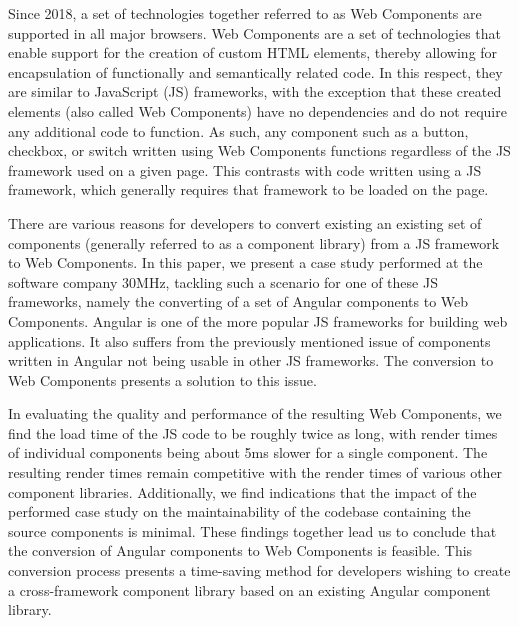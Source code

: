 Since 2018, a set of technologies together referred to as Web Components are supported in all major browsers. Web Components are a set of technologies that enable support for the creation of custom HTML elements, thereby allowing for encapsulation of functionally and semantically related code. In this respect, they are similar to JavaScript (JS) frameworks, with the exception that these created elements (also called Web Components) have no dependencies and do not require any additional code to function. As such, any component such as a button, checkbox, or switch written using Web Components functions regardless of the JS framework used on a given page. This contrasts with code written using a JS framework, which generally requires that framework to be loaded on the page.

There are various reasons for developers to convert existing an existing set of components (generally referred to as a component library) from a JS framework to Web Components. In this paper, we present a case study performed at the software company 30MHz, tackling such a scenario for one of these JS frameworks, namely the converting of a set of Angular components to Web Components. Angular is one of the more popular JS frameworks for building web applications. It also suffers from the previously mentioned issue of components written in Angular not being usable in other JS frameworks. The conversion to Web Components presents a solution to this issue.

In evaluating the quality and performance of the resulting Web Components, we find the load time of the JS code to be roughly twice as long, with render times of individual components being about 5ms slower for a single component. The resulting render times remain competitive with the render times of various other component libraries. Additionally, we find indications that the impact of the performed case study on the maintainability of the codebase containing the source components is minimal. These findings together lead us to conclude that the conversion of Angular components to Web Components is feasible. This conversion process presents a time-saving method for developers wishing to create a cross-framework component library based on an existing Angular component library.